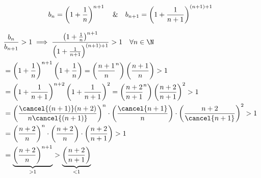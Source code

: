 

\begin{dimo}

\begin{equation}
	b_n = \left( 1 + \frac{1}{n} \right)^{n+1} \quad \& \quad b_{n+1} = \left( 1 + \frac{1}{n+1} \right)^{(n+1)+1}
\end{equation}

\begin{equation}
	\begin{aligned}
	& \frac{b_n}{b_{n+1}} > 1 \implies
	\frac{\bn}{\bnn} > 1 \quad \forall n \in \N \\
	&=\left( 1 + \frac{1}{n} \right)^{n+1} \left( 1 + \frac{1}{n} \right) =
	\left( \frac{n+1}{n}^n \right) \left( \frac{n+1}{n} \right) >1 \\
	&=\left( 1 + \frac{1}{n+1} \right)^{n+2} \left( 1 + \frac{1}{n+1}\right)^2 =
	\left( \frac{n+2}{n+1}^n \right) \left( \frac{n+2}{n+1} \right)^2 >1 \\
	&=\left( \frac{ \cancel{(n+1)} (n+2)}{n \cancel{(n+1)}} \right)^n 
	\cdot \left( \frac{\cancel{n+1}}{n} \right) \cdot 
	\left( \frac{n+2}{\cancel{n+1}} \right)^2 >1\\
	&=\left( \frac{n+2}{n} \right)^n \cdot \left( \frac{n+2}{n} \right)
	\cdot \left( \frac{n+2}{n+1} \right) >1 \\
	&=\underbrace{\left( \frac{n+2}{n} \right)^{n+1}}_{>1} > 
	\underbrace{\left( \frac{n+2}{n+1} \right)}_{<1}\\
	\end{aligned}
\end{equation}	



\end{dimo}

